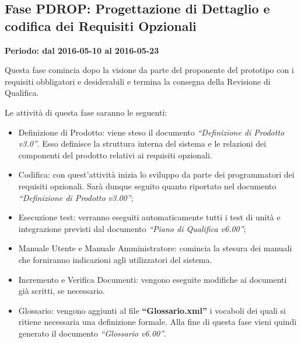 \documentclass[../PianoProgetto.tex]{subfiles}
\begin{document}
	\subsection{Fase PDROP: Progettazione di Dettaglio e codifica dei Requisiti Opzionali}
		\textbf{Periodo: dal 2016-05-10 al 2016-05-23}
		
		Questa fase comincia dopo la visione da parte del proponente del prototipo con i requisiti obbligatori e desiderabili e termina la consegna della Revisione di Qualifica.

		Le attività di questa fase saranno le seguenti:
		\begin{itemize}
			\item Definizione di Prodotto: viene steso il documento \textit{“Definizione di Prodotto v3.0”}. Esso definisce la struttura interna del sistema e le relazioni dei componenti del prodotto relativi ai requisiti opzionali.

			\item Codifica: con quest’attività inizia lo sviluppo da parte dei programmatori dei requisiti opzionali. Sarà dunque seguito quanto riportato nel documento \textit{“Definizione di Prodotto v3.00”};

			\item Esecuzione test: verranno eseguiti automaticamente tutti i test di unità e integrazione previsti dal documento \textit{“Piano di Qualifica v6.00”};

			\item Manuale Utente e Manuale Amministratore: comincia la stesura dei manuali che forniranno indicazioni agli utilizzatori del sistema.

			\item Incremento e Verifica Documenti: vengono eseguite modifiche ai documenti già scritti, se necessario.
			
			\item Glossario: vengono aggiunti al file \textbf{“Glossario.xml”} i vocaboli dei quali si ritiene necessaria una definizione formale. Alla fine di questa fase vieni quindi generato il documento \textit{“Glossario v6.00”}.
		\end{itemize}
		
		
\end{document}
